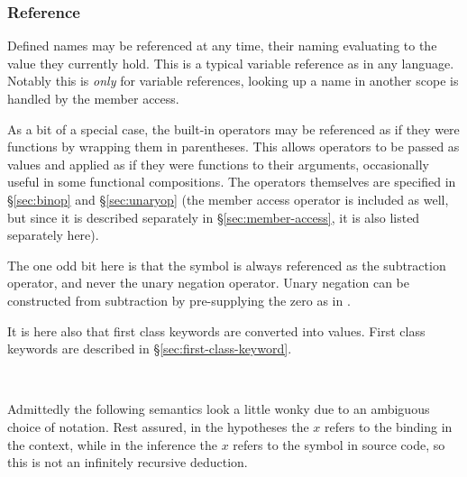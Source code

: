 \subsubsection{Reference}

Defined names may be referenced at any time, their naming evaluating to the value
they currently hold. This is a typical variable reference as in any language.
Notably this is \emph{only} for variable references, looking up a name in another
scope is handled by the member access.

As a bit of a special case, the built-in operators may be referenced as if they
were functions by wrapping them in parentheses. This allows operators to be passed
as values and applied as if they were functions to their arguments, occasionally
useful in some functional compositions. The operators themselves are specified
in \S\ref{sec:binop} and \S\ref{sec:unaryop} (the member access operator is included
as well, but since it is described separately in \S\ref{sec:member-access}, it is
also listed separately here).

The one odd bit here is that the \op{-} symbol is always referenced as the
subtraction operator, and never the unary negation operator. Unary negation
can be constructed from subtraction by pre-supplying the zero as in .

It is here also that first class keywords are converted into values.
First class keywords are described in \S\ref{sec:first-class-keyword}.

\begin{bnf*}
     \\
\end{bnf*}

Admittedly the following semantics look a little wonky due to an ambiguous choice
of notation. Rest assured, in the hypotheses the $x$ refers to the binding in the
context, while in the inference the $x$ refers to the symbol in source code, so
this is not an infinitely recursive deduction.

\begin{prooftree}
\end{prooftree}

